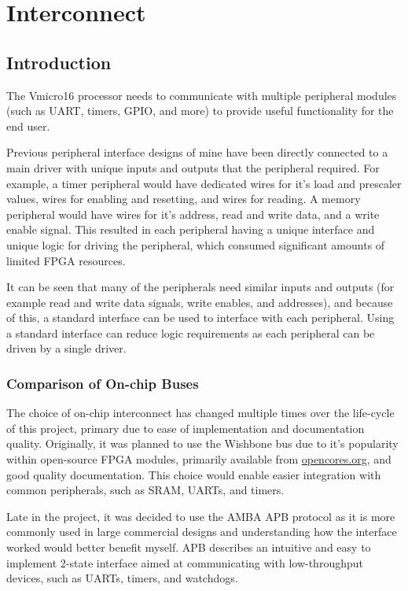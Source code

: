 
\chapter{Interconnect}
\startcontents[chapters]


\section{Introduction}
The Vmicro16 processor needs to communicate with multiple peripheral modules (such as UART, timers, GPIO, and more) to provide useful functionality for the end user.

Previous peripheral interface designs of mine have been directly connected to a main driver with unique inputs and outputs that the peripheral required. For example, a timer peripheral would have dedicated wires for it's load and prescaler values, wires for enabling and resetting, and wires for reading. A memory peripheral would have wires for it's address, read and write data, and a write enable signal. This resulted in each peripheral having a unique interface and unique logic for driving the peripheral, which consumed significant amounts of limited FPGA resources.

It can be seen that many of the peripherals need similar inputs and outputs (for example read and write data signals, write enables, and addresses), and because of this, a standard interface can be used to interface with each peripheral. Using a standard interface can reduce logic requirements as each peripheral can be driven by a single driver.

\subsection{Comparison of On-chip Buses}
The choice of on-chip interconnect has changed multiple times over the life-cycle of this project, primary due to ease of implementation and documentation quality. 
Originally, it was planned to use the Wishbone bus \cite{wishbone} due to it's popularity within open-source FPGA modules, primarily available from \url{opencores.org}, and good quality documentation. This choice would enable easier integration with common peripherals, such as SRAM, UARTs, and timers.

Late in the project, it was decided to use the AMBA APB protocol \cite {ambaapb} as it is more commonly used in large commercial designs and understanding how the interface worked would better benefit myself. APB describes an intuitive and easy to implement 2-state interface aimed at communicating with low-throughput devices, such as UARTs, timers, and watchdogs.

